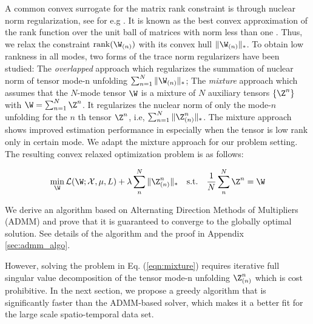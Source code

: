 A common convex surrogate for the matrix rank constraint is through nuclear norm regularization, see for e.g \cite{Negahban2011}. It is known as the best convex approximation of the rank function over the unit ball of matrices with norm less than one \cite{Recht2010}. Thus, we relax the constraint $\text{rank}(\W_{(n)})$ with its convex hull $\|\W_{(n)}\|_*$. To obtain low rankness in all modes, two forms of the trace norm regularizers have been studied: The \textit{overlapped} approach which regularizes the summation of nuclear norm of tensor mode-n unfolding $\sum_{n=1}^N \|\W_{(n)}\|_*$; The \textit{mixture} approach which assumes that the $N$-mode tensor $\W$ is a mixture of $N$ auxiliary tensors $\{\Z^{n}\}$ with $\W = \sum_{n=1}^{N}\Z^n$. It regularizes the nuclear norm of only the mode-$n$ unfolding for the $n$ th tensor $\Z^{n}$, i.e, $\sum_{n=1}^N \|\Z^n_{(n)}\|_*$. The mixture approach shows improved estimation performance in \cite{tomioka2010estimation} especially when the tensor is low rank only in certain mode. We adapt the mixture approach for our problem setting. The resulting convex relaxed optimization problem is as follows:

\vspace{-0.2in}
\begin{align}\label{eqn:mixture}
\min_{\W}\mathcal{L} ( \W; \mathcal{X}, \mu, L)  + \lambda \sum_n^N \|\Z^n_{(n)}\|_*  \quad
\mathrm{s.t.} \quad  \frac{1}{N}\sum\limits_n^N \Z^n = \W
\end{align} 
\vspace{-0.1in}

We derive an algorithm based on Alternating Direction Methods of Multipliers (ADMM) and prove that it is guaranteed to converge to the globally optimal solution. See details of the algorithm and the proof in Appendix \ref{sec:admm_algo}.

However, solving the problem in Eq. (\ref{eqn:mixture}) requires iterative full singular value decomposition of the tensor mode-n unfolding $\Z^n_{(n)}$ which is cost prohibitive. In the next section, we propose a greedy algorithm that is significantly faster than the ADMM-based solver, which makes it a better fit for the large scale spatio-temporal data set. 




